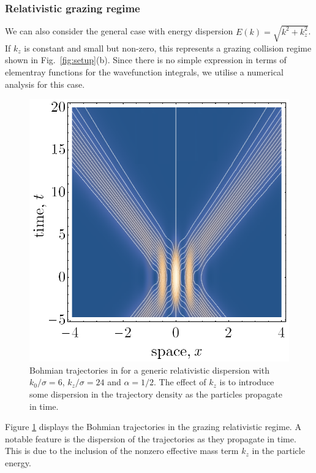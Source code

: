 \documentclass[
prx
,twocolumn
,nofootinbib
,floatfix
,superscriptaddress
]{revtex4-2}
\begin{document}
\subsubsection{Relativistic grazing regime} 
We can also consider the general case with energy dispersion $E(k) = \sqrt{k^2 + k_z^2}$. If $k_z$ is constant and small but non-zero, this represents a grazing collision regime shown in Fig.\ \ref{fig:setup}(b). Since there is no simple expression in terms of elementray functions for the wavefunction integrals, we utilise a numerical analysis for this case. 
\begin{figure}[h]
    \centering
    \includegraphics[width=0.8\linewidth]{Fig4subrelativistic.png}
    \caption{Bohmian trajectories in for a generic relativistic dispersion with $k_0/\sigma = 6$, $k_z/\sigma = 24$ and $\alpha = 1/2$. The effect of $k_z$ is to introduce some dispersion in the trajectory density as the particles propagate in time. }
    \label{fig:subrelativistic}
\end{figure}
Figure \ref{fig:subrelativistic} displays the Bohmian trajectories in the grazing relativistic regime. A notable feature is the dispersion of the trajectories as they propagate in time. This is due to the inclusion of the nonzero effective mass term $k_z$ in the particle energy. 
\end{document}
